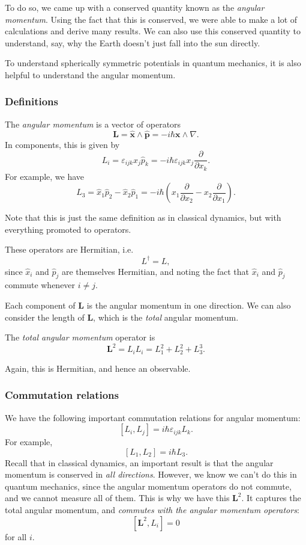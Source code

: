 \documentclass[a4paper]{article}
\begin{document}
To do so, we came up with a conserved quantity known as the \emph{angular momentum}. Using the fact that this is conserved, we were able to make a lot of calculations and derive many results. We can also use this conserved quantity to understand, say, why the Earth doesn't just fall into the sun directly.

To understand spherically symmetric potentials in quantum mechanics, it is also helpful to understand the angular momentum.
\subsubsection*{Definitions}

\begin{defi}
  The \emph{angular momentum} is a vector of operators
  \[
    \mathbf{L} = \hat{\mathbf{x}}\wedge \hat{\mathbf{p}} = -i\hbar \mathbf{x} \wedge \nabla.
  \]
  In components, this is given by
  \[
    L_i = \varepsilon_{ijk} \hat{x}_j\hat{p}_k = -i\hbar \varepsilon_{ijk} x_j \frac{\partial}{\partial x_k}.
  \]
  For example, we have
  \[
    L_3 = \hat{x}_1 \hat{p}_2 - \hat{x}_2 \hat{p}_1 = -i\hbar \left(x_1 \frac{\partial}{\partial x_2} - x_2 \frac{\partial}{\partial x_1}\right).
  \]
\end{defi}
Note that this is just the same definition as in classical dynamics, but with everything promoted to operators.

These operators are Hermitian, i.e.
\[
  L^\dagger = L,
\]
since $\hat{x}_i$ and $\hat{p}_j$ are themselves Hermitian, and noting the fact that $\hat{x}_i$ and $\hat{p}_j$ commute whenever $i \not= j$.

Each component of $\mathbf{L}$ is the angular momentum in one direction. We can also consider the length of $\mathbf{L}$, which is the \emph{total} angular momentum.

\begin{defi}
  The \emph{total angular momentum} operator is
  \[
    \mathbf{L}^2 = L_i L_i = L_1^2 + L_2^2 + L_3^3.
  \]
\end{defi}
Again, this is Hermitian, and hence an observable.

\subsubsection*{Commutation relations}
We have the following important commutation relations for angular momentum:
\[
  [L_i, L_j] = i\hbar \varepsilon_{ijk} L_k.\tag{i}
\]
For example,
\[
  [L_1, L_2] = i\hbar L_3.
\]
Recall that in classical dynamics, an important result is that the angular momentum is conserved in \emph{all directions}. However, we know we can't do this in quantum mechanics, since the angular momentum operators do not commute, and we cannot measure all of them. This is why we have this $\mathbf{L}^2$. It captures the total angular momentum, and \emph{commutes with the angular momentum operators}:
\[
  [\mathbf{L}^2, L_i] = 0\tag{ii}
\]
for all $i$.
\end{document}
